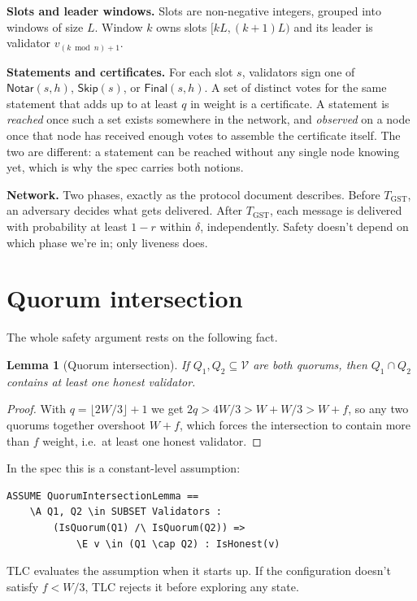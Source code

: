 \documentclass[11pt,a4paper]{article}
\newcommand{\Notar}{\mathsf{Notar}}
\newcommand{\Skip}{\mathsf{Skip}}
\newcommand{\Final}{\mathsf{Final}}
\newcommand{\Validators}{\mathcal{V}}
\newtheorem{lemma}{Lemma}
\begin{document}
\textbf{Slots and leader windows.} Slots are non-negative integers,
grouped into windows of size $L$. Window $k$ owns slots
$[kL, (k+1)L)$ and its leader is validator $v_{(k \bmod n)+1}$.

\textbf{Statements and certificates.} For each slot $s$, validators
sign one of $\Notar(s,h)$, $\Skip(s)$, or $\Final(s,h)$. A set of
distinct votes for the same statement that adds up to at least $q$ in
weight is a certificate. A statement is \emph{reached} once such a
set exists somewhere in the network, and \emph{observed} on a node
once that node has received enough votes to assemble the certificate
itself. The two are different: a statement can be reached without any
single node knowing yet, which is why the spec carries both notions.

\textbf{Network.} Two phases, exactly as the protocol document
describes. Before $T_\mathrm{GST}$, an adversary decides what gets
delivered. After $T_\mathrm{GST}$, each message is delivered with
probability at least $1-r$ within $\delta$, independently. Safety
doesn't depend on which phase we're in; only liveness does.

\section{Quorum intersection}

The whole safety argument rests on the following fact.

\begin{lemma}[Quorum intersection]\label{lem:overlap}
If $Q_1, Q_2 \subseteq \Validators$ are both quorums, then
$Q_1 \cap Q_2$ contains at least one honest validator.
\end{lemma}

\begin{proof}
With $q = \lfloor 2W/3\rfloor + 1$ we get
$2q > 4W/3 > W + W/3 > W + f$, so any two quorums together overshoot
$W + f$, which forces the intersection to contain more than $f$
weight, i.e.\ at least one honest validator.
\end{proof}

In the spec this is a constant-level assumption:

\begin{lstlisting}
ASSUME QuorumIntersectionLemma ==
    \A Q1, Q2 \in SUBSET Validators :
        (IsQuorum(Q1) /\ IsQuorum(Q2)) =>
            \E v \in (Q1 \cap Q2) : IsHonest(v)
\end{lstlisting}

TLC evaluates the assumption when it starts up. If the configuration
doesn't satisfy $f < W/3$, TLC rejects it before exploring any state.
\end{document}
